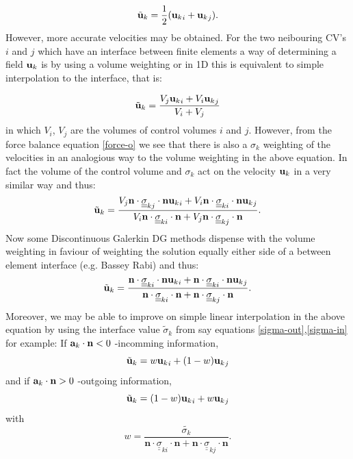 \begin{equation}
{\tilde{\bf u}_k} = \frac{1}{2} ({{\bf u}_k}_i+{{\bf u}_k}_j). 
\end{equation} 
However, more accurate velocities may be obtained. 
For the two neibouring CV's $i$ and $j$ which have an interface 
between finite elements a way of determining a field ${\bf u}_k$ is by using a volume 
weighting or in 1D this is equivalent to simple interpolation to the interface, that is: 

\begin{equation}
{\tilde{\bf u}_k} = \frac{ V_j {{\bf u}_k}_i + V_i {{\bf u}_k}_j  } {V_i +V_j} 
\end{equation} 
in which $V_i$, $V_j$ are the volumes of control volumes $i$ and $j$. 
However, from the force balance equation 
\ref{force-o}  we see that there is also a $\sigma_k$ weighting of the 
velocities in an analogious way to the volume weighting in the above equation. 
In fact the volume of the control volume and $\sigma_k$ act on the velocity ${\bf u}_k$ in a very similar 
way and thus: 
\begin{equation}
{\tilde{\bf u}_k} = \frac{ V_j \mathbf{n}\cdot \underline {\underline\sigma}_{kj} \cdot \mathbf{n} {{\bf u}_k}_i + V_i \mathbf{n}\cdot \underline {\underline\sigma}_{ki} \cdot \mathbf{n} {{\bf u}_k}_j }
{ V_i \mathbf{n}\cdot \underline {\underline\sigma}_{ki} \cdot \mathbf{n} + V_j  {\mathbf{n}\cdot \underline {\underline\sigma}_{kj} \cdot \mathbf{n} }}. 
\end{equation} 
Now some Discontinuous Galerkin DG methods dispense with the volume weighting 
in faviour of weighting the solution equally either side of a between element interface (e.g. Bassey Rabi) 
and thus: 
\begin{equation}
{\tilde{\bf u}_k} = \frac{ \mathbf{n}\cdot \underline {\underline\sigma}_{ki} \cdot \mathbf{n}{{\bf u}_k}_i + \mathbf{n}\cdot \underline {\underline\sigma}_{ki} \cdot \mathbf{n} {{\bf u}_k}_j }
{ \mathbf{n}\cdot \underline {\underline\sigma}_{ki} \cdot \mathbf{n} + \mathbf{n}\cdot \underline {\underline\sigma}_{kj} \cdot \mathbf{n} }. 
\end{equation} 
Moreover, we may be able to improve on simple linear interpolation in the above equation 
by using the interface value $\tilde\sigma_k$ from say equations \ref{sigma-out},\ref{sigma-in} for 
example: 
If ${\bf a}_k\cdot {\bf n}<0$ -incomming information, 
\begin{equation}
{\tilde{\bf u}_k} = w {{\bf u}_k}_i + (1-w) {{\bf u}_k}_j
\end{equation} 
and if ${\bf a}_k\cdot {\bf n}>0$ -outgoing information, 
\begin{equation}
{\tilde{\bf u}_k} = (1-w) {{\bf u}_k}_i + w {{\bf u}_k}_j
\end{equation} 
with
\begin{equation}
w=\frac{\tilde{\sigma_k}}{ \mathbf{n}\cdot \underline {\underline\sigma}_{ki} \cdot \mathbf{n} + \mathbf{n}\cdot \underline {\underline\sigma}_{kj} \cdot \mathbf{n} }. 
\end{equation} 



